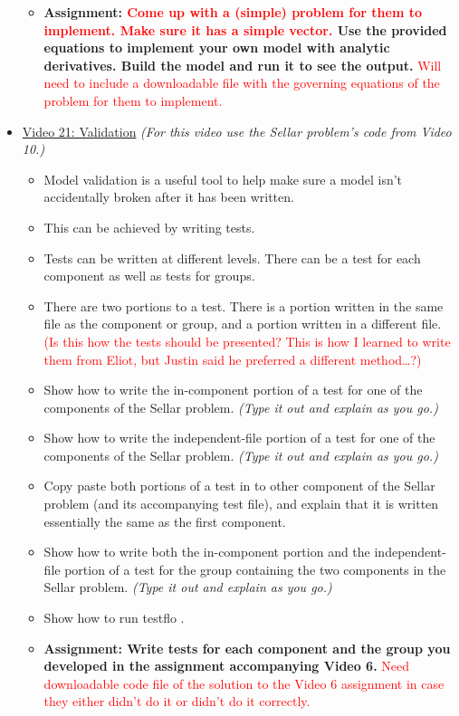 \documentclass[12pt, letterpaper]{article}
\begin{document}
\begin{itemize}
\begin{itemize}
			\item \textbf{Assignment: \textcolor{red}{Come up with a (simple) problem for them to implement. Make sure it has a simple vector.} Use the provided equations to implement your own model with analytic derivatives. Build the model and run it to see the output.} \textcolor{red}{Will need to include a downloadable file with the governing equations of the problem for them to implement.}
		\end{itemize}
		
	\item \underline{Video 21: Validation} \textit{(For this video use the Sellar problem’s code from Video 10.)} 
		\begin{itemize}
			\item Model validation is a useful tool to help make sure a model isn’t accidentally broken after it has been written.
			\item This can be achieved by writing tests.
			\item Tests can be written at different levels. There can be a test for each component as well as tests for groups. 
			\item There are two portions to a test. There is a portion written in the same file as the component or group, and a portion written in a different file. \textcolor{red}{(Is this how the tests should be presented? This is how I learned to write them from Eliot, but Justin said he preferred a different method…?)}
			\item Show how to write the in-component portion of a test for one of the components of the Sellar problem. \textit{(Type it out and explain as you go.)}
			\item Show how to write the independent-file portion of a test for one of the components of the Sellar problem. \textit{(Type it out and explain as you go.)}
			\item Copy paste both portions of a test in to other component of the Sellar problem (and its accompanying test file), and explain that it is written essentially the same as the first component.
			\item Show how to write both the in-component portion and the independent-file portion of a test for the group containing the two components in the Sellar problem. \textit{(Type it out and explain as you go.)}
			\item Show how to run testflo .
			\item \textbf{Assignment: Write tests for each component and the group you developed in the assignment accompanying Video 6.} \textcolor{red}{Need downloadable code file of the solution to the Video 6 assignment in case they either didn't do it or didn't do it correctly.}
		\end{itemize}
	

\end{itemize}
\end{document}
